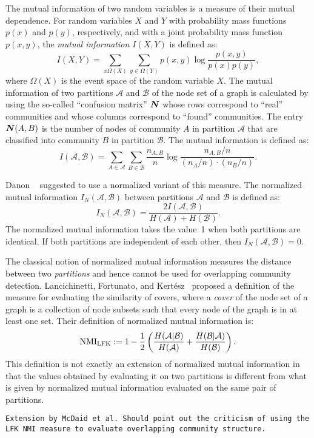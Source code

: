 The mutual information of two random variables is a measure of their mutual dependence. For random 
variables $X$ and $Y$ with probability mass functions $p(x)$ and $p(y)$, respectively, and 
with a joint probability mass function $p(x, y)$, the \emph{mutual information $I(X, Y)$} 
is defined as:
\begin{equation}\label{eqn:mutual_information_rv}
I(X, Y) = \sum_{x \Omega(X)} \sum_{y \in \Omega(Y)} p(x, y) \log \frac{p(x, y)}{p(x) p(y)},
\end{equation}
where $\Omega(X)$ is the event space of the random variable $X$.
The mutual information of two partitions $\mathcal{A}$ and $\mathcal{B}$ 
of the node set of a graph is calculated by using the so-called ``confusion matrix'' 
$\boldsymbol{N}$ whose rows correspond to ``real'' communities and whose columns correspond 
to ``found'' communities. The entry $\boldsymbol{N}(A, B)$ is the number of nodes of community 
$A$ in partition $\mathcal{A}$ that are classified into community $B$ in partition $\mathcal{B}$. 
The mutual information is defined as:
\begin{equation}\label{eqn:mutual_information_graphs}
I(\mathcal{A}, \mathcal{B}) = 
	\sum_{A \in \mathcal{A}} \sum_{B \in \mathcal{B}} \frac{n_{A, B}}{n} 
		\log \frac{n_{A, B} / n}{ (n_A / n) \cdot (n_B / n) }.  
\end{equation}

Danon \etal~\cite{DDDA05} suggested to use a normalized variant of this measure. The 
normalized mutual information $I_N(\mathcal{A}, \mathcal{B})$ between partitions 
$\mathcal{A}$ and $\mathcal{B}$ is defined as:
\begin{equation} \label{eqn:normalized_mutual_information}
I_N(\mathcal{A}, \mathcal{B}) =  \frac{2 I(\mathcal{A}, \mathcal{B})}{H(\mathcal{A}) + H(\mathcal{B})}.
\end{equation}
The normalized mutual information takes the value~1 when both partitions are identical. If both partitions 
are independent of each other, then $I_N(\mathcal{A}, \mathcal{B}) = 0$. 

The classical notion of normalized mutual information measures the distance  between 
two \emph{partitions} and hence cannot be used for overlapping community detection. 
Lancichinetti, Fortunato, and Kert\'{e}sz~\cite{LFK09} proposed a definition of the measure for 
evaluating the similarity of covers, where a \emph{cover} of the node set of a graph 
is a collection of node subsets such that every node of the graph is in at least one set. 
Their definition of normalized mutual information is:
\begin{equation} \label{eqn:nmi_LFK}
\mathrm{NMI}_{\mathrm{LFK}} := 1 - \frac{1}{2} 
		\left ( \frac{H(\mathcal{A} | \mathcal{B})}{H(\mathcal{A})} + \frac{H(\mathcal{B}
				| \mathcal{A})}{H(\mathcal{B})}\right ).
\end{equation}
This definition is not exactly an extension of normalized mutual information in that the values
obtained by evaluating it on two partitions is different from what is given by normalized mutual 
information evaluated on the same pair of partitions.

\texttt{Extension by McDaid et al. Should point out the criticism of using the LFK NMI measure 
to evaluate overlapping community structure.}
